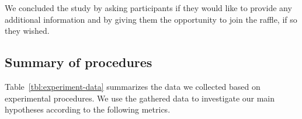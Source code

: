 We concluded the study by asking participants if they would like to provide any additional information and 
by giving them the opportunity to join the raffle, if so they wished. 



\subsection{Summary of procedures}



Table~\ref{tbl:experiment-data} summarizes the data we collected based on experimental procedures.
We use the gathered data to investigate our main hypotheses according to the following metrics.
































